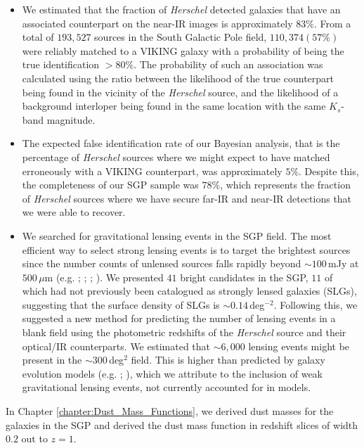 \begin{itemize}
    \item We estimated that the fraction of \textit{Herschel} detected galaxies that have an associated counterpart on the near-IR images is approximately $83\%$. From a total of $193,527$ sources in the South Galactic Pole field, $110,374 (57\%)$ were reliably matched to a VIKING galaxy with a probability of being the true identification $> 80\%$. The probability of such an association was calculated using the ratio between the likelihood of the true counterpart being found in the vicinity of the \textit{Herschel} source, and the likelihood of a background interloper being found in the same location with the same $K_s$-band magnitude.
    \item The expected false identification rate of our Bayesian analysis, that is the percentage of \textit{Herschel} sources where we might expect to have matched erroneously with a VIKING counterpart, was approximately $5\%$. Despite this, the completeness of our SGP sample was $78\%$, which represents the fraction of \textit{Herschel} sources where we have secure far-IR and near-IR detections that we were able to recover.
    \item We searched for gravitational lensing events in the SGP field. The most efficient way to select strong lensing events is to target the brightest sources since the number counts of unlensed sources falls rapidly beyond $\sim100\,$mJy at $500\,\mu$m (e.g. \citealt{Vieira_2010}; \citealt{Wardlow_2013}; \citealt{Nayyeri_2016}; \citealt{Negrello_2017}). We presented $41$ bright candidates in the SGP, $11$ of which had not previously been catalogued as strongly lensed galaxies (SLGs), suggesting that the surface density of SLGs is $\sim0.14\,$deg$^{-2}$. Following this, we suggested a new method for predicting the number of lensing events in a blank field using the photometric redshifts of the \textit{Herschel} source and their optical/IR counterparts. We estimated that $\sim6,000$ lensing events might be present in the $\sim300\,$deg$^{2}$ field. This is higher than predicted by galaxy evolution models (e.g. \citealt{Negrello_2007}; \citealt{Cai_2013}), which we attribute to the inclusion of weak gravitational lensing events, not currently accounted for in models.
\end{itemize}

In Chapter \ref{chapter:Dust_Mass_Functions}, we derived dust masses for the galaxies in the SGP and derived the dust mass function in redshift slices of width $0.2$ out to $z = 1$.

